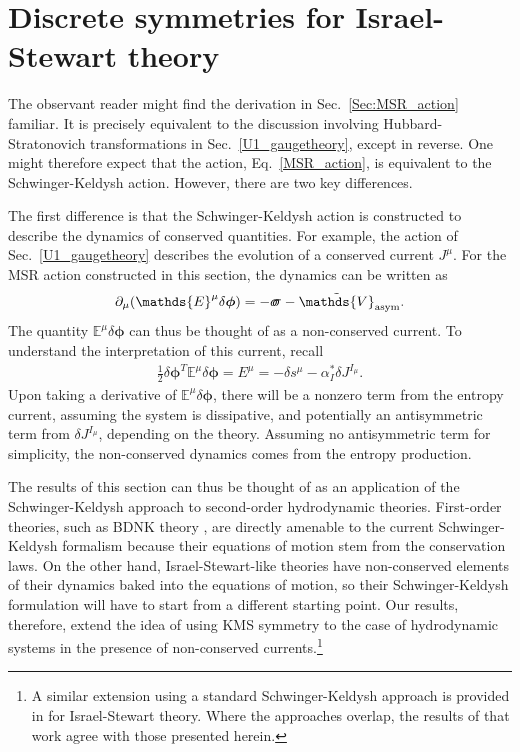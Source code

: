 \documentclass[aps,prd,nofootinbib,amsmath,amssymb,showpacs,longbibliography,singlecolumn,superscriptaddress,notitlepage]{revtex4-1}
\theoremstyle{plain}
\theoremstyle{definition}
\newcommand*{\Scale}[2][4]{\scalebox{#1}{$#2$}}%
\newcommand{\forceds}[1]{\Scale[1.1]{\ensuremath{\mathrlap{{{#1}}}\hspace{1.4pt}#1}}}
\newcommand{\cvec}[1]{\ensuremath{\bm {#1}}}
\newcommand{\cmat}[1]{\ensuremath{\mathds{{#1}}}}
\newcommand{\cmatgreek}[1]{\ensuremath{\forceds{{#1}}}}
\begin{document}
\section{Discrete symmetries for Israel-Stewart theory}
\label{Sec:Comparison_SK}

The observant reader might find the derivation in Sec.\ \ref{Sec:MSR_action} familiar. It is precisely equivalent to the discussion involving Hubbard-Stratonovich transformations in Sec.\ \ref{U1_gaugetheory}, except in reverse. One might therefore expect that the action, Eq.\ \eqref{MSR_action}, is equivalent to the Schwinger-Keldysh action. However, there are two key differences. 

The first difference is that the Schwinger-Keldysh action is constructed to describe the dynamics of conserved quantities. For example, the action of Sec.\ \ref{U1_gaugetheory} describes the evolution of a conserved current $J^{\mu}$. 
For the MSR action constructed in this section, the dynamics can be written as 
\begin{equation}
    \partial_{\mu} (\cmat{E}^{\mu} \delta \cvec{\phi}) = -\cmatgreek{\sigma} - \tilde{\cmat{V}}_{\mathrm{asym}} . 
\end{equation}
The quantity $\cmat{E}^{\mu} \delta \cvec{\phi}$ can thus be thought of as a non-conserved current. To understand the interpretation of this current, recall
\begin{eqnarray}
    \frac{1}{2} \delta \cvec{\phi}^T \cmat{E}^{\mu} \delta \cvec{\phi} = E^{\mu} = -\delta s^{\mu} - \alpha_I^* \delta J^{I_{\mu}} .
\end{eqnarray}
Upon taking a derivative of $\cmat{E}^{\mu} \delta \cvec{\phi}$, there will be a nonzero term from the entropy current, assuming the system is dissipative, and potentially an antisymmetric term from $\delta J^{I_{\mu}}$, depending on the theory. Assuming no antisymmetric term for simplicity, the non-conserved dynamics comes from the entropy production. 


The results of this section can thus be thought of as an application of the Schwinger-Keldysh approach to second-order hydrodynamic theories. First-order theories, such as BDNK theory \cite{BemficaDisconziNoronha, Kovtun:2019hdm, Bemfica:2019knx,Bemfica:2020zjp}, are directly amenable to the current Schwinger-Keldysh formalism \cite{Liu:2018kfw} because their equations of motion stem from the conservation laws. On the other hand, Israel-Stewart-like theories have non-conserved elements of their dynamics baked into the equations of motion, so their Schwinger-Keldysh formulation will have to start from a different starting point. Our results, therefore, extend the idea of using KMS symmetry to the case of hydrodynamic systems in the presence of non-conserved currents.\footnote{A similar extension using a standard Schwinger-Keldysh approach is provided in \cite{JainKovtun:Placeholder} for Israel-Stewart theory. Where the approaches overlap, the results of that work agree with those presented herein.}
\end{document}
